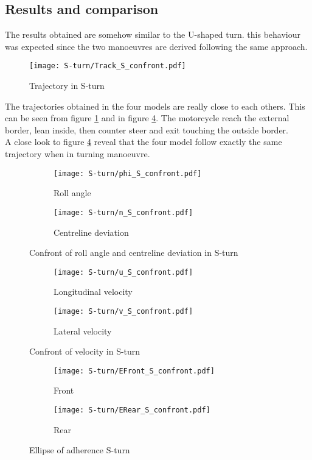 \subsection{Results and comparison}
%
The results obtained are somehow similar to the U-shaped turn. this behaviour was expected since the two manoeuvres are derived following the same approach.\\
%
\begin{figure}[!htb]
    \centering
    \texttt{[image: S-turn/Track\_S\_confront.pdf]}
    \caption{Trajectory in S-turn}
    \label{fig:STrajectory}
\end{figure}
%
The trajectories obtained in the four models are really close to each others. This can be seen from figure \ref{fig:STrajectory} and in figure \ref{fig:S2b}. The motorcycle reach the external border, lean inside, then counter steer and exit touching the outside border.\\
A close look to figure \ref{fig:S2b} reveal that the four model follow exactly the same trajectory when in turning manoeuvre.
%
\begin{figure}[!htb]
    \begin{subfigure}{0.5\linewidth}
        \texttt{[image: S-turn/phi\_S\_confront.pdf]}
        \caption{Roll angle}
        \label{fig:S2a}
    \end{subfigure}%
    \begin{subfigure}{0.5\linewidth}
        \texttt{[image: S-turn/n\_S\_confront.pdf]}
        \caption{Centreline deviation}
        \label{fig:S2b}
    \end{subfigure}
    \caption{Confront of roll angle and centreline deviation in S-turn}
\end{figure}
%
%
\begin{figure}[!htb]
    \begin{subfigure}{0.5\linewidth}
        \texttt{[image: S-turn/u\_S\_confront.pdf]}
        \caption{Longitudinal velocity}
        \label{fig:S1a}
    \end{subfigure}%
    \begin{subfigure}{0.5\linewidth}
        \texttt{[image: S-turn/v\_S\_confront.pdf]}
        \caption{Lateral velocity}
        \label{fig:S1b}
    \end{subfigure}
    \caption{Confront of velocity in S-turn}
\end{figure}
%
%
\begin{figure}[!htb]
    \begin{subfigure}{0.5\linewidth}
        \texttt{[image: S-turn/EFront\_S\_confront.pdf]}
        \caption{Front}
        \label{fig:SEa}
    \end{subfigure}%
    \begin{subfigure}{0.5\linewidth}
        \texttt{[image: S-turn/ERear\_S\_confront.pdf]}
        \caption{Rear}
        \label{fig:SEb}
    \end{subfigure}
    \caption{Ellipse of adherence S-turn}
\end{figure}

